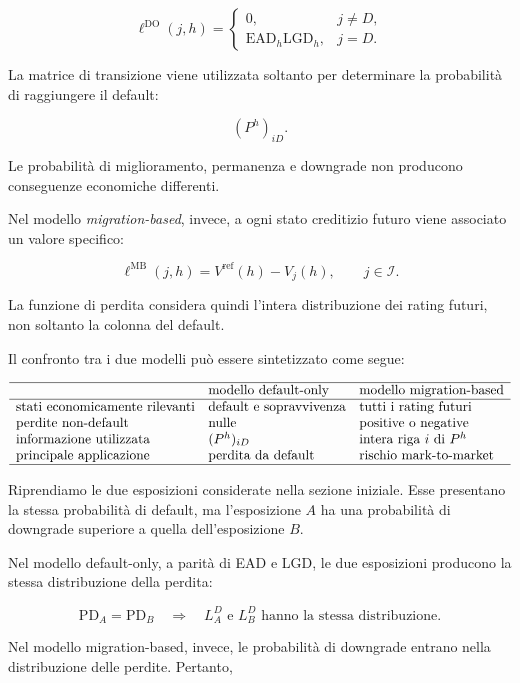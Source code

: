 \[
\ell^{\mathrm{DO}}(j,h)
=
\begin{cases}
0,
&
j\neq D,
\\[1mm]
\mathrm{EAD}_h\mathrm{LGD}_h,
&
j=D.
\end{cases}
\]

La matrice di transizione viene utilizzata soltanto per determinare la
probabilit\`{a} di raggiungere il default:

\[
(P^h)_{iD}.
\]

Le probabilit\`{a} di miglioramento, permanenza e downgrade non
producono conseguenze economiche differenti.

Nel modello \emph{migration-based}, invece, a ogni stato creditizio
futuro viene associato un valore specifico:

\[
\ell^{\mathrm{MB}}(j,h)
=
V^{\mathrm{ref}}(h)-V_j(h),
\qquad
j\in\mathcal{I}.
\]

La funzione di perdita considera quindi l'intera distribuzione dei
rating futuri, non soltanto la colonna del default.

Il confronto tra i due modelli pu\`{o} essere sintetizzato come segue:

\[
\begin{array}{lll}
\hline
&
\text{modello default-only}
&
\text{modello migration-based}
\\
\hline
\text{stati economicamente rilevanti}
&
\text{default e sopravvivenza}
&
\text{tutti i rating futuri}
\\
\text{perdite non-default}
&
\text{nulle}
&
\text{positive o negative}
\\
\text{informazione utilizzata}
&
(P^h)_{iD}
&
\text{intera riga $i$ di $P^h$}
\\
\text{principale applicazione}
&
\text{perdita da default}
&
\text{rischio mark-to-market}
\\
\hline
\end{array}
\]

Riprendiamo le due esposizioni considerate nella sezione iniziale. Esse
presentano la stessa probabilit\`{a} di default, ma l'esposizione $A$
ha una probabilit\`{a} di downgrade superiore a quella
dell'esposizione $B$.

Nel modello default-only, a parit\`{a} di EAD e LGD, le due esposizioni
producono la stessa distribuzione della perdita:

\[
\mathrm{PD}_A
=
\mathrm{PD}_B
\quad\Longrightarrow\quad
L_A^{D}
\text{ e }
L_B^{D}
\text{ hanno la stessa distribuzione}.
\]

Nel modello migration-based, invece, le probabilit\`{a} di downgrade
entrano nella distribuzione delle perdite. Pertanto,

